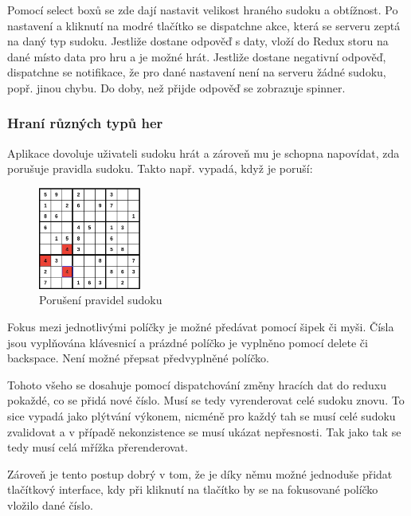 \documentclass[a4paper,oneside,12pt]{report}
\let\openright=\clearpage
\begin{document}
Pomocí select boxů se zde dají nastavit velikost hraného sudoku a obtížnost. Po nastavení a kliknutí na modré tlačítko se dispatchne akce, která se serveru zeptá na daný typ sudoku. Jestliže dostane odpověď s daty, vloží do Redux storu na dané místo data pro hru a je možné hrát. Jestliže dostane negativní odpověď, dispatchne se notifikace, že pro dané nastavení není na serveru žádné sudoku, popř. jinou chybu. Do doby, než přijde odpověď se zobrazuje spinner.

\subsection{Hraní různých typů her}

Aplikace dovoluje uživateli sudoku hrát a zároveň mu je schopna napovídat, zda porušuje pravidla sudoku. Takto např. vypadá, když je poruší: 

\begin{figure}[H]
   \centering
   \includegraphics[width=0.3\textwidth]{../img/badSudoku.jpg}
   \caption[Porušení pravidel sudoku]{Porušení pravidel sudoku}
   \label{fig:architecture}
\end{figure}

Fokus mezi jednotlivými políčky je možné předávat pomocí šipek či myši. Čísla jsou vyplňována klávesnicí a prázdné políčko je vyplněno pomocí delete či backspace. Není možné přepsat předvyplněné políčko. 

Tohoto všeho se dosahuje pomocí dispatchování změny hracích dat do reduxu pokaždé, co se přidá nové číslo. Musí se tedy vyrenderovat celé sudoku znovu. To sice vypadá jako plýtvání výkonem, nicméně pro každý tah se musí celé sudoku zvalidovat a v případě nekonzistence se musí ukázat nepřesnosti. Tak jako tak se tedy musí celá mřížka přerenderovat. 

Zároveň je tento postup dobrý v tom, že je díky němu možné jednoduše přidat tlačítkový interface, kdy při kliknutí na tlačítko by se na fokusované políčko vložilo dané číslo.

\chapter*{}
\setcounter{page}{6}




\listoffigures
\openright
\end{document}
